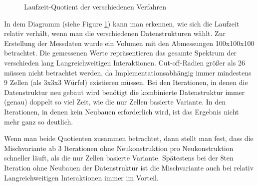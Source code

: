 \documentclass[
	12pt,
	a4paper,
	BCOR10mm,
	DIV14,
	headsepline,
]{scrreprt}
\begin{document}
	\begin{figure}[h]
		\centering
		\caption{Laufzeit-Quotient der verschiedenen Verfahren}
		\label{figure:LaufzeitQuotient}
	\end{figure}
	In dem Diagramm (siehe Figure \ref{figure:LaufzeitQuotient}) kann man erkennen, wie sich die Laufzeit relativ verhält, wenn man die verschiedenen Datenstrukturen wählt. Zur Erstellung der Messdaten wurde ein Volumen mit den Abmessungen 100x100x100  betrachtet. Die gemessenen Werte repräsentieren das gesamte Spektrum der verschieden lang Langreichweitigen Interaktionen. Cut-off-Radien größer als 26 müssen nicht betrachtet werden, da Implementationsabhängig immer mindestens 9 Zellen (als 3x3x3 Würfel) existieren müssen. Bei den Iterationen, in denen die Datenstruktur neu gebaut wird benötigt die kombinierte Datenstruktur immer (genau) doppelt so viel Zeit, wie die nur Zellen basierte Variante. In den Iterationen, in denen kein Neubauen erforderlich wird, ist das Ergebnis nicht mehr ganz so deutlich.
	
	Wenn man beide Quotienten zusammen betrachtet, dann stellt man fest, dass die Mischvariante ab 3 Iterationen ohne Neukonstruktion pro Neukonstruktion schneller läuft, als die nur Zellen basierte Variante. Spätestens bei der 8ten Iteration ohne Neubauen der Datenstruktur ist die Mischvariante auch bei relativ Langreichweitigen Interaktionen immer im Vorteil.
\newpage
\end{document}
